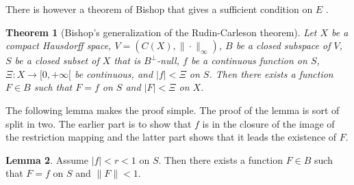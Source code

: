 \documentclass[a4paper,12pt,twoside,BCOR=10mm]{scrbook}
\newtheorem{theorem}{Theorem}[section]
\theoremstyle{definition}
\theoremstyle{definition}
\newtheorem{lemma}[theorem]{Lemma}
\theoremstyle{definition}
\begin{document}
There is however a theorem of Bishop that gives a sufficient condition on $E$ \citep{bishop}.
\begin{theorem}[Bishop's generalization of the Rudin-Carleson theorem]
\label{bishopstheorem}
Let $X$ be a compact Hausdorff space,
	$V = (C(X), \| \cdot \|_{\infty})$,
	$B$ be a closed subspace of $V$,
	$S$ be a closed subset of $X$ that is $B^{\bot}$-null, %
	$f$ be a continuous function on $S$,
	$\Xi: X \rightarrow [0, +\infty[$ be continuous,
	and $|f| < \Xi$ on $S$.
Then there exists a function $F \in B$ such that $F = f$ on $S$ and $|F| < \Xi$ on $X$.
\end{theorem}
The following lemma makes the proof simple.
The proof of the lemma is sort of split in two.
The earlier part is to show that $f$ is in the closure of the image of the restriction mapping and the latter part shows that it leads the existence of $F$.
\begin{lemma}
\label{bishoplemma}
Assume $|f| < r < 1$ on $S$.
Then there exists a function $F \in B$ such that $F = f$ on $S$ and $\|F\| < 1$.
\end{lemma}
\end{document}
